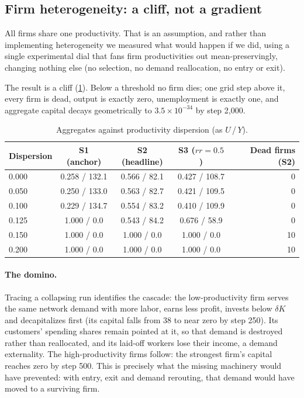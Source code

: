 \subsection{Firm heterogeneity: a cliff, not a gradient}
\label{sec:heterogeneity}

All firms share one productivity. That is an assumption, and rather than
implementing heterogeneity we measured what would happen if we did,
using a single experimental dial that fans firm productivities out
mean-preservingly, changing nothing else (no selection, no demand
reallocation, no entry or exit).

The result is a cliff (\cref{tab:heterogeneity}). Below a threshold no firm
dies; one grid step above it, every firm is dead, output is exactly
zero, unemployment is exactly one, and aggregate capital decays geometrically
to $3.5\times10^{-34}$ by step 2{,}000.

\begin{table}[htbp]
\centering
\small
\caption{Aggregates against productivity dispersion (as $U$\,/\,$Y$).}
\label{tab:heterogeneity}
\begin{tabular}{lcccr}
\toprule
Dispersion & S1 (anchor) & S2 (headline) & S3 ($rr = 0.5$) & Dead firms (S2)\\
\midrule
0.000 & 0.258 / 132.1 & 0.566 / 82.1 & 0.427 / 108.7 & 0\\
0.050 & 0.250 / 133.0 & 0.563 / 82.7 & 0.421 / 109.5 & 0\\
0.100 & 0.229 / 134.7 & 0.554 / 83.2 & 0.410 / 109.9 & 0\\
0.125 & 1.000 / 0.0 & 0.543 / 84.2 & 0.676 / 58.9 & 0\\
0.150 & 1.000 / 0.0 & 1.000 / 0.0 & 1.000 / 0.0 & 10\\
0.200 & 1.000 / 0.0 & 1.000 / 0.0 & 1.000 / 0.0 & 10\\
\bottomrule
\end{tabular}
\end{table}

\paragraph{The domino.} Tracing a collapsing run identifies the cascade: the
low-productivity firm serves the same network demand with more labor, earns
less profit, invests below $\delta K$ and decapitalizes first (its capital
falls from 38 to near zero by step 250). Its customers' spending shares remain
pointed at it, so that demand is destroyed rather than reallocated, and its laid-off workers lose their income, a demand externality. The
high-productivity firms follow: the strongest firm's capital reaches zero by
step 500. This is precisely what the missing machinery would have
prevented: with entry, exit and demand rerouting, that demand would have moved
to a surviving firm.

